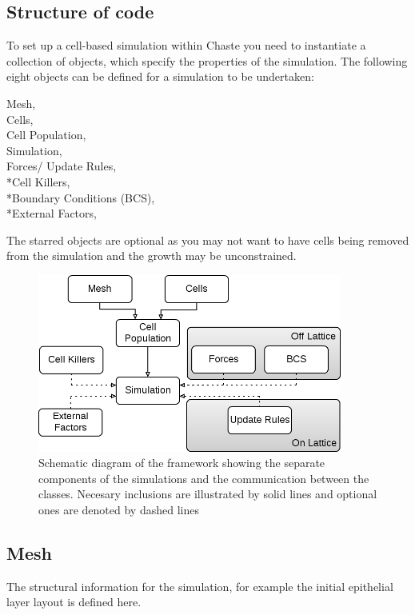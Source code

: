 \documentclass{siamltex}
\begin{document}
\subsection{Structure of code} \label{sec:code}
To set up a cell-based simulation within Chaste you need to instantiate a collection of objects, which specify the properties of the simulation. 
The following eight objects can be defined for a simulation to be undertaken:
\begin{description}
  \item [Mesh,] 
  \item [Cells,] 
  \item [Cell Population,] 
  \item [Simulation,] 
  \item [Forces/ Update Rules,] 
  \item [*Cell Killers,] 
  \item [*Boundary Conditions (BCS),] 
  \item [*External Factors,]
\end{description}
The starred objects are optional as you may not want to have cells being removed from the simulation and the growth may be unconstrained. 

\begin{figure}[tbhp]
        \centering
        \includegraphics[width=10cm]{Figs/CellBasedStructure}
        \caption{Schematic diagram of the framework showing the separate components of the simulations and the communication between the classes. Necesary inclusions are illustrated by solid lines and optional ones are denoted by dashed lines} 
       \label{fig:SimulationComponents}
\end{figure}


\subsection{Mesh} \label{sec:structure:mesh}
The structural information for the simulation, for example the initial epithelial layer layout is defined here.
\end{document}

